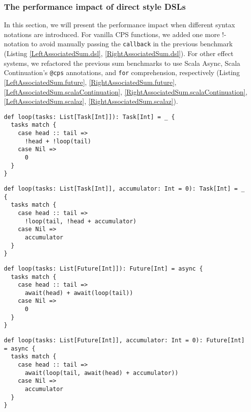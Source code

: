 \subsubsection{The performance impact of direct style DSLs}

In this section, we will present the performance impact when different syntax notations are introduced. For vanilla CPS functions, we added one more !-notation to avoid manually passing the \lstinline{callback} in the previous benchmark (Listing \ref{LeftAssociatedSum.dsl}, \ref{RightAssociatedSum.dsl}). For other effect systems, we refactored the previous sum benchmarks to use Scala Async, Scala Continuation's \lstinline{@cps} annotations, and \lstinline{for} comprehension, respectively (Listing \ref{LeftAssociatedSum.future}, \ref{RightAssociatedSum.future}, \ref{LeftAssociatedSum.scalaContinuation}, \ref{RightAssociatedSum.scalaContinuation}, \ref{LeftAssociatedSum.scalaz}, \ref{RightAssociatedSum.scalaz}).

\begin{lstlisting}[caption={Left-associated sum based on LDKs of \textit{Dsl.scala}},label={LeftAssociatedSum.dsl}]
def loop(tasks: List[Task[Int]]): Task[Int] = _ {
  tasks match {
    case head :: tail =>
      !head + !loop(tail)
    case Nil =>
      0
  }
}
\end{lstlisting}

\begin{lstlisting}[caption={Right-associated sum based on LDKs of \textit{Dsl.scala}},label={RightAssociatedSum.dsl}]
def loop(tasks: List[Task[Int]], accumulator: Int = 0): Task[Int] = _ {
  tasks match {
    case head :: tail =>
      !loop(tail, !head + accumulator)
    case Nil =>
      accumulator
  }
}
\end{lstlisting}

\begin{lstlisting}[caption={Left-associated sum based on Scala Async},label={LeftAssociatedSum.future}]
def loop(tasks: List[Future[Int]]): Future[Int] = async {
  tasks match {
    case head :: tail =>
      await(head) + await(loop(tail))
    case Nil =>
      0
  }
}
\end{lstlisting}

\begin{lstlisting}[caption={Right-associated sum based on Scala Async},label={RightAssociatedSum.future}]
def loop(tasks: List[Future[Int]], accumulator: Int = 0): Future[Int] = async {
  tasks match {
    case head :: tail =>
      await(loop(tail, await(head) + accumulator))
    case Nil =>
      accumulator
  }
}
\end{lstlisting}

